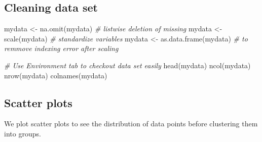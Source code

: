 \documentclass[
]{article}
\newenvironment{Shaded}{\begin{snugshade}}{\end{snugshade}}
\newcommand{\AttributeTok}[1]{\textcolor[rgb]{0.77,0.63,0.00}{#1}}
\newcommand{\CommentTok}[1]{\textcolor[rgb]{0.56,0.35,0.01}{\textit{#1}}}
\newcommand{\DecValTok}[1]{\textcolor[rgb]{0.00,0.00,0.81}{#1}}
\newcommand{\FunctionTok}[1]{\textcolor[rgb]{0.00,0.00,0.00}{#1}}
\newcommand{\NormalTok}[1]{#1}
\newcommand{\OtherTok}[1]{\textcolor[rgb]{0.56,0.35,0.01}{#1}}
\newcommand{\SpecialCharTok}[1]{\textcolor[rgb]{0.00,0.00,0.00}{#1}}
\newcommand{\StringTok}[1]{\textcolor[rgb]{0.31,0.60,0.02}{#1}}
\begin{document}
\hypertarget{cleaning-data-set}{%
\subsection{Cleaning data set}\label{cleaning-data-set}}

\begin{Shaded}
\begin{Highlighting}[]
\NormalTok{mydata }\OtherTok{\textless{}{-}} \FunctionTok{na.omit}\NormalTok{(mydata) }\CommentTok{\# listwise deletion of missing}
\NormalTok{mydata }\OtherTok{\textless{}{-}} \FunctionTok{scale}\NormalTok{(mydata) }\CommentTok{\# standardize variables}
\NormalTok{mydata }\OtherTok{\textless{}{-}} \FunctionTok{as.data.frame}\NormalTok{(mydata) }\CommentTok{\# to remmove indexing error after scaling}

\CommentTok{\# Use \textquotesingle{}Environment tab\textquotesingle{} to checkout data set easily}
\FunctionTok{head}\NormalTok{(mydata)}
\FunctionTok{ncol}\NormalTok{(mydata)}
\FunctionTok{nrow}\NormalTok{(mydata)}
\FunctionTok{colnames}\NormalTok{(mydata)}
\end{Highlighting}
\end{Shaded}

\hypertarget{scatter-plots}{%
\subsection{Scatter plots}\label{scatter-plots}}

We plot scatter plots to see the distribution of data points before
clustering them into groups.

\begin{Shaded}
\end{Shaded}
\end{document}
